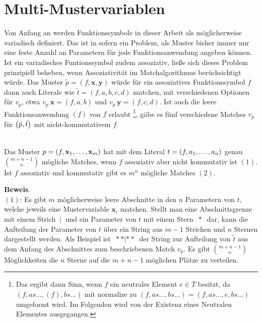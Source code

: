 \section{Multi-Mustervariablen} \label{subsecMulti}

Von Anfang an werden Funktionssymbole in dieser Arbeit als möglicherweise variadisch definiert. Das ist in sofern ein Problem, als Muster bisher immer nur eine feste Anzahl an Parametern für jede Funktionsanwendung angeben können. Ist ein variadisches Funtionssymbol zudem assoziativ, ließe sich dieses Problem prinzipiell beheben, wenn Assoziativität im Matchalgorithmus berücksichtigt würde. Das Muster $\tilde p = (f, \mathbf x, \mathbf y)$ würde für ein assoziatives Funktionssymbol $f$ dann auch Literale wie $\tilde t = (f, a, b, c, d)$ matchen, mit verschiedenen Optionen für $v_p$, etwa $v_p~\mathbf x = (f, a, b)$ und $v_p~\mathbf y = (f, c, d)$. Ist auch die leere Funktionsanwendung $(f)$ von $f$ erlaubt \footnote{Das ergibt dann Sinn, wenn $f$ ein neutrales Element $e \in T$ besitzt, da $(f, as..., (f), bs...)$ mit $\mathrm{normalize}$ zu $(f, as..., bs...) = (f, as..., e, bs...)$ umgeformt wird. Im Folgenden wird von der Existenz eines Neutralen Elementes ausgegangen.}, gäbe es fünf verschiedene Matches $v_p$ für $\paren*{\tilde p, \tilde t}$ mit nicht-kommutativem $f$.

\begin{lemma}~\\
Das Muster $p = (f, \elems {\mathbf x} 1 m)$ hat mit dem Literal $t = (f, \elems a 1 n)$ genau ${m + n - 1}\choose n$ mögliche Matches, wenn $f$ assoziativ aber nicht kommutativ ist $(1)$. Ist $f$ assoziativ und kommutativ gibt es $m^n$ mögliche Matches $(2)$.\\
\end{lemma}

\textbf{Beweis}.\\
$(1)$: Es gibt $m$ möglicherweise leere Abschnitte in den $n$ Parametern von $t$, welche jeweils eine Mustervariable $\mathbf x_i$ matchen. Stellt man eine Abschnittsgrenze mit einem Strich $~|~$ und ein Parameter von $t$ mit einem Stern $~*~$ dar, kann die Aufteilung der Parameter von $t$ über ein String aus $m - 1$ Strichen und $n$ Sternen dargestellt werden. 
Als Beispiel ist $~**|**~$ der String zur Aufteilung von $\tilde t$ aus dem Anfang des Abschnittes zum beschriebenen Match $v_p$.
Es gibt ${m + n - 1}\choose n$ Möglichkeiten die $n$ Sterne auf die ${m + n - 1}$ möglichen Plätze zu verteilen.\\

